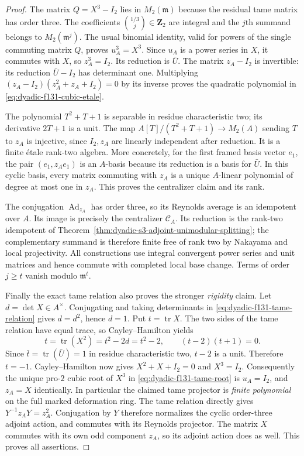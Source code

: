 \documentclass[11pt]{article}
\theoremstyle{definition}
\begin{document}
\begin{proof}
The matrix $Q=X^3-I_2$ lies in
$M_2(\mathfrak m)$ because the
residual tame matrix has order
three.  The coefficients
$\binom{1/3}{j}\in\mathbf Z_2$
are integral and the $j$th
summand belongs to
$M_2(\mathfrak m^j)$.
The usual binomial identity,
valid for powers of the single
commuting matrix $Q$, proves
$u_A^3=X^3$.
Since $u_A$ is a power series
in $X$, it commutes with $X$,
so $z_A^3=I_2$.
Its reduction is $\bar U$.
The matrix $z_A-I_2$ is invertible:
its reduction $\bar U-I_2$
has determinant one.
Multiplying
$(z_A-I_2)(z_A^2+z_A+I_2)=0$
by its inverse proves the
quadratic polynomial in
\eqref{eq:dyadic-f131-cubic-etale}.

The polynomial $T^2+T+1$
is separable in residue
characteristic two; its
derivative $2T+1$ is a unit.
The map
$A[T]/(T^2+T+1)\to M_2(A)$
sending $T$ to $z_A$
is injective, since
$I_2,z_A$ are linearly
independent after reduction.
It is a finite étale rank-two
algebra.
More concretely, for the
first framed basis vector $e_1$,
the pair $(e_1,z_A e_1)$
is an $A$-basis because its
reduction is a basis for
$\bar U$.  In this cyclic basis,
every matrix commuting with $z_A$
is a unique $A$-linear
polynomial of degree at most
one in $z_A$.
This proves the centralizer
claim and its rank.

The conjugation
$\operatorname{Ad}_{z_A}$
has order three, so its
Reynolds average is an
idempotent over $A$.
Its image is precisely the
centralizer $\mathcal C_A$.
Its reduction is the rank-two
idempotent of
Theorem~\ref{thm:dyadic-s3-adjoint-unimodular-splitting};
the complementary summand is
therefore finite free of rank
two by Nakayama and local
projectivity.
All constructions use integral
convergent power series and
unit matrices and hence commute
with completed local base
change.  Terms of order
$j\ge t$ vanish modulo
$\mathfrak m^t$.

Finally the exact tame relation
also proves the stronger
\emph{rigidity} claim.
Let $d=\det X\in A^\times$.
Conjugating and taking
determinants in
\eqref{eq:dyadic-f131-tame-relation}
gives $d=d^2$, hence $d=1$.
Put $t=\operatorname{tr}X$.
The two sides of the tame
relation have equal trace,
so Cayley--Hamilton yields
\[
t=\operatorname{tr}(X^2)=t^2-2d=t^2-2,
\qquad (t-2)(t+1)=0.
\]
Since $\bar t=\operatorname{tr}(\bar U)=1$
in residue characteristic two,
$t-2$ is a unit.
Therefore $t=-1$.
Cayley--Hamilton now gives
$X^2+X+I_2=0$ and $X^3=I_2$.
Consequently the unique
pro-$2$ cubic root of $X^3$
in \eqref{eq:dyadic-f131-tame-root}
is $u_A=I_2$, and
$z_A=X$ identically.
In particular the claimed
tame projector is \emph{finite
polynomial} on the full
marked deformation ring.
The tame relation directly gives
$Y^{-1}z_A Y=z_A^2$.
Conjugation by $Y$ therefore
normalizes the cyclic
order-three adjoint action,
and commutes with its
Reynolds projector.
The matrix $X$ commutes with
its own odd component $z_A$,
so its adjoint action does as
well.  This proves all
assertions.
\end{proof}
\end{document}
